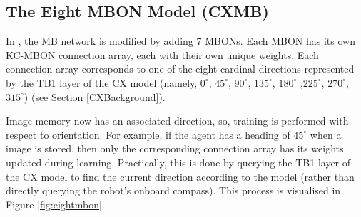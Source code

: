 \documentclass[a4paper,11pt,twoside,openright]{article}
\begin{document}
\subsection{ The Eight MBON Model (CXMB) } \label{CXMBBackground}
In \cite{Zhang2017}, the MB network is modified by adding 7 MBONs. Each MBON has
its own KC-MBON connection array, each with their own unique weights. Each
connection array corresponds to one of the eight cardinal directions represented
by the TB1 layer of the CX model (namely, $0^{\circ}$, $45^{\circ}$,
$90^{\circ}$, $135^{\circ}$, $180^{\circ}$ ,$225^{\circ}$, $270^{\circ}$,
$315^{\circ}$) (see Section \ref{CXBackground}).
\newline
\par

Image memory now has an associated direction, so, training is performed with
respect to orientation. For example, if the agent has a heading of $45^{\circ}$
when a image is stored, then only the corresponding connection array has its
weights updated during learning. Practically, this is done by querying the TB1
layer of the CX model to find the current direction according to the model
(rather than directly querying the robot's onboard compass). This process is
visualised in Figure \ref{fig:eightmbon}.
\newline
\par
\end{document}
